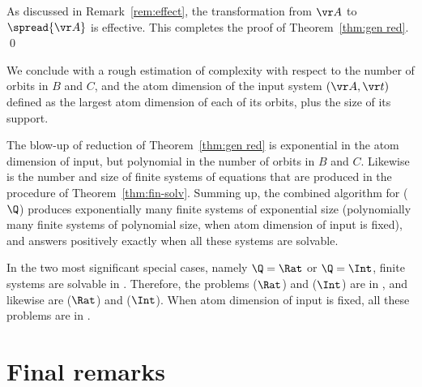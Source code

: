 As discussed in Remark~\ref{rem:effect}, the transformation from $\vr A$ to $\spread{\vr A}$ is effective.
This completes the proof of Theorem~\ref{thm:gen red}.
\qed

We conclude with a rough estimation of complexity with respect to the number of orbits in $B$ and $C$,
and the atom dimension of the input system $(\vr A, \vr t)$ defined as the largest atom dimension
of each of its orbits, plus the size of its support.

The blow-up of reduction of Theorem~\ref{thm:gen red} is exponential in the atom dimension
of input, but polynomial in the number of orbits in $B$ and $C$.
Likewise is the number and size of finite systems of equations that are produced in the procedure of 
Theorem~\ref{thm:fin-solv}.
Summing up, the combined algorithm for \solvname($\Q$) produces exponentially many 
finite systems of exponential size
(polynomially many finite systems of polynomial size, when atom dimension of input is fixed), 
and answers positively exactly when all these systems are solvable.

In the two most significant special cases, namely $\Q = \Rat$ or $\Q = \Int$, finite systems are solvable in \PTIME.
Therefore, the problems \solvname($\Rat$) and \solvname($\Int$) are in \ETIME, and likewise
are \finsolvname($\Rat$) and \finsolvname($\Int$).
When atom dimension of input is fixed, all these problems are in \PTIME.


     


\section{Final remarks}

